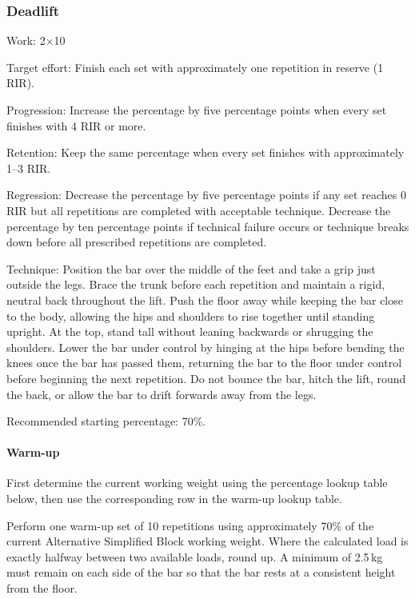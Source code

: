 \documentclass[11pt,a4paper]{article}
\begin{document}
\newpage
\subsubsection{Deadlift}

Work: 2$\times$10

Target effort: Finish each set with approximately one repetition in reserve (1 RIR).

Progression: Increase the percentage by five percentage points when every set finishes with 4 RIR or more.

Retention: Keep the same percentage when every set finishes with approximately 1--3 RIR.

Regression: Decrease the percentage by five percentage points if any set reaches 0 RIR but all repetitions are completed with acceptable technique. Decrease the percentage by ten percentage points if technical failure occurs or technique breaks down before all prescribed repetitions are completed.

Technique: Position the bar over the middle of the feet and take a grip just outside the legs. Brace the trunk before each repetition and maintain a rigid, neutral back throughout the lift. Push the floor away while keeping the bar close to the body, allowing the hips and shoulders to rise together until standing upright. At the top, stand tall without leaning backwards or shrugging the shoulders. Lower the bar under control by hinging at the hips before bending the knees once the bar has passed them, returning the bar to the floor under control before beginning the next repetition. Do not bounce the bar, hitch the lift, round the back, or allow the bar to drift forwards away from the legs.

Recommended starting percentage: 70\%.

\paragraph{Warm-up}

First determine the current working weight using the percentage lookup table below, then use the corresponding row in the warm-up lookup table.

Perform one warm-up set of 10 repetitions using approximately 70\% of the current Alternative Simplified Block working weight. Where the calculated load is exactly halfway between two available loads, round up. A minimum of 2.5\,kg must remain on each side of the bar so that the bar rests at a consistent height from the floor.
\end{document}
